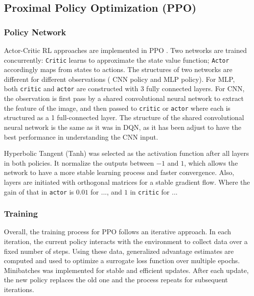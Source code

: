\documentclass{article}
\begin{document}
\subsection{Proximal Policy Optimization (PPO)}


\subsubsection{Policy Network}
Actor-Critic RL approaches are implemented in PPO \cite{konda_actor-critic_1999}. Two networks are trained concurrently: \texttt{Critic} learns to approximate the state value function; \texttt{Actor} accordingly maps from states to actions. The structures of two networks are different for different observations ( CNN policy and MLP policy). For MLP, both \texttt{critic} and \texttt{actor} are constructed with 3 fully connected layers. For CNN, the observation is first pass by a shared convolutional neural network to extract the feature of the image, and then passed to \texttt{critic} or \texttt{actor} where each is structured as a 1 full-connected layer. The structure of the shared convolutional neural network is the same as it was in DQN, as it has been adjust to have the best performance in understanding the CNN input. 

Hyperbolic Tangent (Tanh) was selected as the activation function after all layers in both policies. It normalize the outputs between $-1$ and $1$, which allows the network to have a more stable learning process and faster convergence. Also, layers are initiated  with orthogonal matrices for a stable gradient flow. Where the gain of that in \texttt{actor} is $0.01$ for ..., and $1$ in \texttt{critic} for ...

\subsubsection{Training}
Overall, the training process for PPO follows an iterative approach\cite{schulman_proximal_2017}. In each iteration, the current policy interacts with the environment to collect data over a fixed number of steps. Using these data, generalized advantage estimates are computed and used to optimize a surrogate loss function over multiple epochs. Minibatches was implemented for stable and efficient updates. After each update, the new policy replaces the old one and the process repeats for subsequent iterations. 
\end{document}
